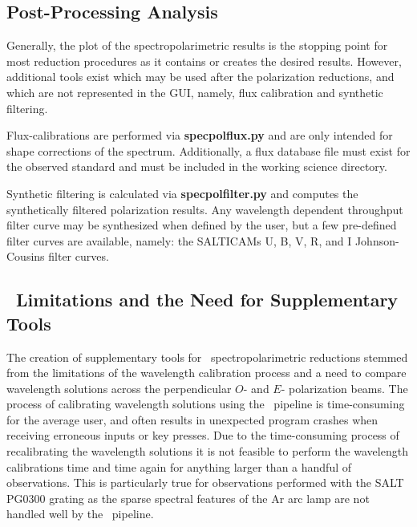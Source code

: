 \subsection{Post-Processing Analysis}

Generally, the plot of the spectropolarimetric results is the stopping point for most reduction procedures as it contains or creates the desired results.
However, additional tools exist which may be used after the polarization reductions, and which are not represented in the \gls{GUI}, namely, flux calibration and synthetic filtering.

\pagebreak

Flux-calibrations are performed via \textbf{specpolflux.py} and are only intended for shape corrections of the spectrum.
Additionally, a flux database file must exist for the observed standard and must be included in the working science directory.

Synthetic filtering is calculated via \textbf{specpolfilter.py} and computes the synthetically filtered polarization results.
Any wavelength dependent throughput filter curve may be synthesized when defined by the user, but a few pre-defined filter curves are available, namely: the \glspl{SALTICAM} \gls{U}, \gls{B}, \gls{V}, \gls{R}, and \gls{I} \gls{Johnson-Cousins} filter curves.

\subsection[The Need for Supplementary Tools]{\polsalt\ Limitations and the Need for Supplementary Tools} \label{subsec:polsalt_limits}

The creation of supplementary tools for \polsalt\ spectropolarimetric reductions stemmed from the limitations of the wavelength calibration process and a need to compare wavelength solutions across the perpendicular $O$- and $E$- polarization beams.
The process of calibrating wavelength solutions using the \polsalt\ pipeline is time-consuming for the average user, and often results in unexpected program crashes when receiving erroneous inputs or key presses.
Due to the time-consuming process of recalibrating the wavelength solutions it is not feasible to perform the wavelength calibrations time and time again for anything larger than a handful of observations.
This is particularly true for observations performed with the \gls{SALT} PG$0300$ grating as the sparse spectral features of the \gls{Ar} arc lamp are not handled well by the \polsalt\ pipeline.

